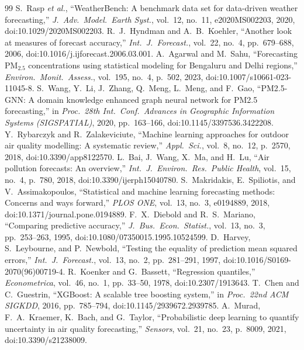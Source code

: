 \documentclass[conference]{IEEEtran}
\begin{document}
\begin{thebibliography}{99}
 S.~Rasp \emph{et al.}, ``WeatherBench: A benchmark data set for data-driven weather forecasting,'' \emph{J.\ Adv.\ Model.\ Earth Syst.}, vol.~12, no.~11, e2020MS002203, 2020, doi:10.1029/2020MS002203.
 R.~J.~Hyndman and A.~B.~Koehler, ``Another look at measures of forecast accuracy,'' \emph{Int.\ J.\ Forecast.}, vol.~22, no.~4, pp.~679--688, 2006, doi:10.1016/j.ijforecast.2006.03.001.
 A.~Agarwal and M.~Sahu, ``Forecasting PM$_{2.5}$ concentrations using statistical modeling for Bengaluru and Delhi regions,'' \emph{Environ.\ Monit.\ Assess.}, vol.~195, no.~4, p.~502, 2023, doi:10.1007/s10661-023-11045-8.
 S.~Wang, Y.~Li, J.~Zhang, Q.~Meng, L.~Meng, and F.~Gao, ``PM2.5-GNN: A domain knowledge enhanced graph neural network for PM2.5 forecasting,'' in \emph{Proc.\ 28th Int.\ Conf.\ Advances in Geographic Information Systems (SIGSPATIAL)}, 2020, pp.~163--166, doi:10.1145/3397536.3422208.
 Y.~Rybarczyk and R.~Zalakeviciute, ``Machine learning approaches for outdoor air quality modelling: A systematic review,'' \emph{Appl.\ Sci.}, vol.~8, no.~12, p.~2570, 2018, doi:10.3390/app8122570.
 L.~Bai, J.~Wang, X.~Ma, and H.~Lu, ``Air pollution forecasts: An overview,'' \emph{Int.\ J.\ Environ.\ Res.\ Public Health}, vol.~15, no.~4, p.~780, 2018, doi:10.3390/ijerph15040780.
 S.~Makridakis, E.~Spiliotis, and V.~Assimakopoulos, ``Statistical and machine learning forecasting methods: Concerns and ways forward,'' \emph{PLOS ONE}, vol.~13, no.~3, e0194889, 2018, doi:10.1371/journal.pone.0194889.
 F.~X.~Diebold and R.~S.~Mariano, ``Comparing predictive accuracy,'' \emph{J.\ Bus.\ Econ.\ Statist.}, vol.~13, no.~3, pp.~253--263, 1995, doi:10.1080/07350015.1995.10524599.
 D.~Harvey, S.~Leybourne, and P.~Newbold, ``Testing the equality of prediction mean squared errors,'' \emph{Int.\ J.\ Forecast.}, vol.~13, no.~2, pp.~281--291, 1997, doi:10.1016/S0169-2070(96)00719-4.
 R.~Koenker and G.~Bassett, ``Regression quantiles,'' \emph{Econometrica}, vol.~46, no.~1, pp.~33--50, 1978, doi:10.2307/1913643.
 T.~Chen and C.~Guestrin, ``XGBoost: A scalable tree boosting system,'' in \emph{Proc.\ 22nd ACM SIGKDD}, 2016, pp.~785--794, doi:10.1145/2939672.2939785.
 A.~Murad, F.~A.~Kraemer, K.~Bach, and G.~Taylor, ``Probabilistic deep learning to quantify uncertainty in air quality forecasting,'' \emph{Sensors}, vol.~21, no.~23, p.~8009, 2021, doi:10.3390/s21238009.

\end{thebibliography}
\end{document}
